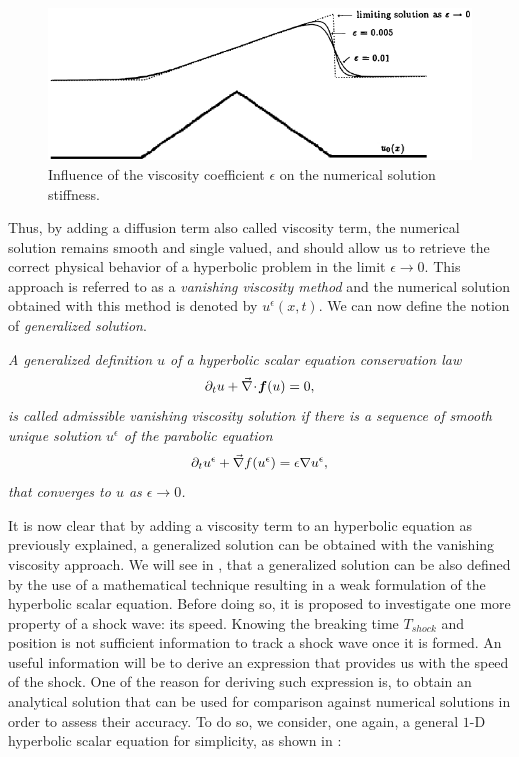 %
\begin{figure}[H]
\centering
\includegraphics[width=\textwidth]{figures/effect_of_epsilon.png}
\caption{Influence of the viscosity coefficient $\epsilon$ on the numerical solution stiffness.}
\label{fig:epsilon}
\end{figure}
%
Thus, by adding a diffusion term also called viscosity term, the numerical solution remains smooth and single valued, and should allow us to retrieve the correct physical behavior of a hyperbolic problem in the limit $\epsilon \to 0$. This approach is referred to as a \emph{vanishing viscosity method} and the numerical solution obtained with this method is denoted by $u^{\epsilon}(x,t)$. We can now define the notion of \emph{generalized solution}. 
%
\begin{definition}
\emph{
A generalized definition $u$ of a hyperbolic scalar equation conservation law 
\begin{equation}
\partial_t u + \vec{\nabla}\! \cdot \! \boldsymbol f(u) = 0, \nonumber
\end{equation}
is called admissible vanishing viscosity solution if there is a sequence of smooth unique solution $u^{\epsilon}$ of the parabolic equation 
\begin{equation}
\partial_t u^{\epsilon} +  \vec{\nabla} f(u^{\epsilon}) = \epsilon \nabla u^{\epsilon}, \nonumber
\end{equation}
that converges to $u$ as $\epsilon \to 0$.}
\end{definition}
%
It is now clear that by adding a viscosity term to an hyperbolic equation as previously explained, a generalized solution can be obtained with the vanishing viscosity approach. We will see in , that a generalized solution can be also defined by the use of a mathematical technique resulting in a weak formulation of the hyperbolic scalar equation. Before doing so, it is proposed to investigate one more property of a shock wave: its speed. Knowing the breaking time $T_{shock}$ and position is not sufficient information to track a shock wave once it is formed. An useful information will be to derive an expression that provides us with the speed of the shock. One of the reason for deriving such expression is, to obtain an analytical solution that can be used for comparison against numerical solutions in order to assess their accuracy. To do so, we consider, one again, a general $1$-D hyperbolic scalar equation for simplicity, as shown in :
